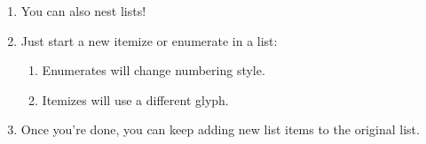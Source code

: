 \documentclass{article}
\begin{document}
\begin{enumerate}
  \item You can also nest lists!
  \item Just start a new itemize or enumerate in a list:
    \begin{enumerate}
      \item Enumerates will change numbering style.
      \item Itemizes will use a different glyph.
    \end{enumerate}
  \item Once you're done, you can keep adding new
    list items to the original list.
\end{enumerate}
\end{document}
